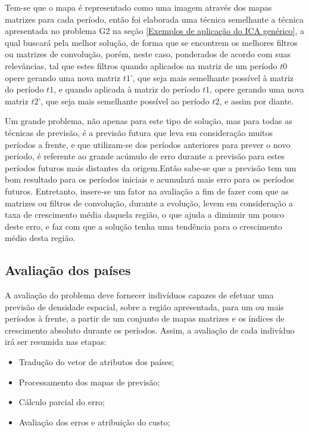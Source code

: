 Tem-se que o mapa é representado como uma imagem através dos mapas matrizes para cada período, então foi elaborada uma técnica  semelhante a técnica apresentada no problema G2 na seção \ref{Exemplos de aplicação do ICA genérico}, a qual buscará pela melhor solução, de forma que se encontrem os melhores filtros ou matrizes de convolução, porém, neste caso,  ponderados de acordo com suas relevâncias, tal que estes filtros quando aplicados na matriz de um período \(t0\) opere gerando uma nova matriz \(t1’\), que seja mais semelhante possível à matriz do período \(t1\), e quando aplicada à matriz do período \(t1\), opere gerando uma nova matriz \(t2’\), que seja mais semelhante possível ao período \(t2\), e assim por diante.

Um grande problema, não apenas para este tipo de solução, mas para todas as técnicas de previsão, é a previsão futura que leva em consideração muitos períodos a frente, e que utilizam-se dos períodos anteriores para prever o novo período, é  referente ao grande acúmulo de erro durante a previsão para estes períodos futuros mais distantes da origem.Então sabe-se que a previsão tem um bom resultado para os períodos iniciais e acumulará mais erro para os períodos futuros. Entretanto, insere-se um fator na avaliação a fim de fazer com que as matrizes ou filtros de convolução, durante a evolução, levem em consideração a taxa de crescimento média daquela região, o que ajuda a diminuir um pouco deste erro, e faz com que a solução tenha uma tendência para o crescimento médio desta região.


\subsection{Avaliação dos países}
\label{Avaliação dos países}

A avaliação do problema deve fornecer indivíduos capazes de efetuar uma previsão de densidade espacial, sobre a região apresentada, para um ou mais períodos à frente, a partir de um conjunto de mapas matrizes e os índices de crescimento absoluto durante os períodos. Assim, a avaliação de cada indivíduo irá ser resumida nas etapas:
\begin{itemize}
\item Tradução do vetor de atributos dos países;
\item Processamento dos mapas de previsão; 
\item Cálculo parcial do erro;
\item Avaliação dos erros e atribuição do custo;
\end{itemize}

